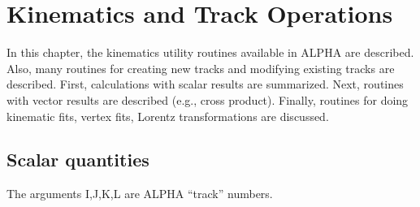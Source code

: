 \chapter{\label{sec-KI} Kinematics and Track Operations}
\par
In this chapter, the kinematics
utility routines available in ALPHA are
described.  Also, many routines for creating new tracks and modifying
existing tracks are described.
First, calculations with scalar results are summarized.  Next,
routines with vector results are described (e.g., cross product).
Finally,
routines for doing kinematic fits, vertex fits,
Lorentz transformations are discussed.
 
\section{\label{sec-MK}Scalar quantities}
\par
The arguments I,J,K,L are ALPHA ``track'' numbers.
 
